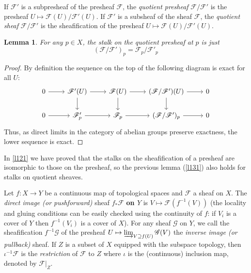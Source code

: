 \documentclass[12pt]{article}
\newtheorem{lemma}{Lemma}[subsection]
\theoremstyle{remark}
\begin{document}
	If $\mathscr F'$ is a subpresheaf of the presheaf $\mathscr F$, the \textit{quotient presheaf} $\mathscr F/\mathscr F'$ is the presheaf $U\mapsto\mathscr F(U)/\mathscr F'(U)$. If $\mathscr F'$ is a subsheaf of the sheaf $\mathscr F$, the \textit{quotient sheaf} $\mathscr F/\mathscr F'$ is the sheafification of the presheaf $U\mapsto\mathscr F(U)/\mathscr F'(U)$.
	\begin{lemma}\label{l131}
	For any $p\in X$, the stalk on the quotient presheaf at $p$ is just
	\[(\mathscr F/\mathscr F')_p=\mathscr F_p/\mathscr F'_p\]
	\end{lemma}
	\begin{proof}
	By definition the sequence on the top of the following diagram is exact for all $U$:
	\[
	\begin{tikzcd}
0 \arrow[r] & \mathscr F'(U) \arrow[r] \arrow[d] & \mathscr F(U) \arrow[r] \arrow[d] & (\mathscr F/\mathscr F')(U) \arrow[r] \arrow[d] & 0 \\
0 \arrow[r] & \mathscr F_p' \arrow[r]            & \mathscr F_p \arrow[r]            & (\mathscr F/\mathscr F')_p \arrow[r]            & 0
\end{tikzcd}
	\]
	Thus, as direct limits in the category of abelian groups preserve exactness, the lower sequence is exact.
	\end{proof}
	In \autoref{l121} we have proved that the stalks on the sheafification of a presheaf are isomorphic to those on the presheaf, so the previous lemma (\autoref{l131}) also holds for  stalks on quotient sheaves.
	
	Let $f:X\to Y$ be a continuous map of topological spaces and $\mathscr F$ a sheaf on $X$. The \textit{direct image (or pushforward)} sheaf $f_*\mathscr F$ \textbf{on $Y$} is $V\mapsto \mathscr F(f^{-1}(V))$ (the locality and gluing conditions can be easily checked using the continuity of $f$: if $V_i$ is a cover of $Y$ then $f^{-1}(V_i)$ is a cover of $X$). For any sheaf $\mathscr G$ on $Y$, we call the sheafification $f^{-1}\mathscr G$ of the presheaf $U\mapsto \varinjlim_{V\supseteq f(U)}\mathscr G(V)$ the \textit{inverse image (or pullback)} sheaf. If $Z$ is a subset of $X$ equipped with the subspace topology, then $\iota^{-1}\mathscr F$ is the \textit{restriction} of $\mathscr F$ to $Z$ where $\iota$ is the (continuous) inclusion map, denoted by $\mathscr F|_Z$.
	
\end{document}
